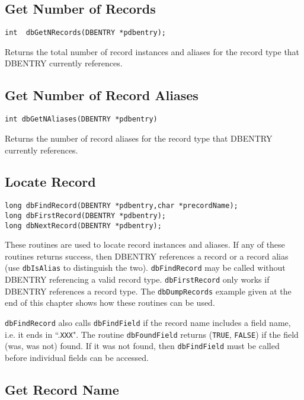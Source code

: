 \subsection{Get Number of Records}

\begin{verbatim}int  dbGetNRecords(DBENTRY *pdbentry);
\end{verbatim}Returns the total number of record instances and aliases for the record type that DBENTRY currently references.

\subsection{Get Number of Record Aliases}

\begin{verbatim}int dbGetNAliases(DBENTRY *pdbentry)
\end{verbatim}Returns the number of record aliases for the record type that DBENTRY currently references.

\subsection{Locate Record}

\begin{verbatim}long dbFindRecord(DBENTRY *pdbentry,char *precordName);
long dbFirstRecord(DBENTRY *pdbentry);
long dbNextRecord(DBENTRY *pdbentry);
\end{verbatim}
These routines are used to locate record instances and aliases. If any of these routines returns success, then DBENTRY 
references a record or a record alias (use \verb|dbIsAlias| to distinguish the two). \verb|dbFindRecord| may be called without 
DBENTRY referencing a valid record type. \verb|dbFirstRecord| only works if DBENTRY references a record type. The 
\verb|dbDumpRecords| example given at the end of this chapter shows how these routines can be used.

\verb|dbFindRecord| also calls \verb|dbFindField| if the record name includes a field name, i.e. it ends in ``.\verb|XXX|". The routine 
\verb|dbFoundField| returns (\verb|TRUE|, \verb|FALSE|) if the field (was, was not) found. If it was not found, then \verb|dbFindField| must 
be called before individual fields can be accessed.

\subsection{Get Record Name}


